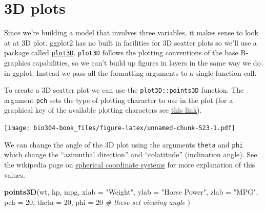 \documentclass[]{book}
\newenvironment{Shaded}{\begin{snugshade}}{\end{snugshade}}
\newcommand{\CommentTok}[1]{\textcolor[rgb]{0.56,0.35,0.01}{\textit{#1}}}
\newcommand{\DataTypeTok}[1]{\textcolor[rgb]{0.13,0.29,0.53}{#1}}
\newcommand{\DecValTok}[1]{\textcolor[rgb]{0.00,0.00,0.81}{#1}}
\newcommand{\KeywordTok}[1]{\textcolor[rgb]{0.13,0.29,0.53}{\textbf{#1}}}
\newcommand{\NormalTok}[1]{#1}
\newcommand{\OperatorTok}[1]{\textcolor[rgb]{0.81,0.36,0.00}{\textbf{#1}}}
\newcommand{\StringTok}[1]{\textcolor[rgb]{0.31,0.60,0.02}{#1}}
\theoremstyle{definition}
\theoremstyle{definition}
\theoremstyle{definition}
\theoremstyle{remark}
\begin{document}
\hypertarget{d-plots}{%
\section{3D plots}\label{d-plots}}

Since we're building a model that involves three variables, it makes
sense to look at at 3D plot. ggplot2 has no built in facilities for 3D
scatter plots so we'll use a package called
\href{http://www.rforscience.com/rpackages/visualisation/plot3d/}{\texttt{plot3D}}.
\texttt{plot3D} follows the plotting conventions of the base R-graphics
capabilities, so we can't build up figures in layers in the same way we
do in ggplot. Instead we pass all the formatting arguments to a single
function call.

To create a 3D scatter plot we can use the \texttt{plot3D::points3D}
function. The argument \texttt{pch} sets the type of plotting character
to use in the plot (for a graphical key of the available plotting
characters see
\href{https://www.statmethods.net/advgraphs/parameters.html}{this
link}).

\begin{Shaded}
\end{Shaded}

\texttt{[image: bio304-book\_files/figure-latex/unnamed-chunk-523-1.pdf]}

We can change the angle of the 3D plot using the arguments
\texttt{theta} and \texttt{phi} which change the ``azimuthal direction''
and ``colatitude'' (inclination angle). See the wikipedia page on
\href{https://en.wikipedia.org/wiki/Spherical_coordinate_system}{spherical
coordinate systems} for more explanation of this values.

\begin{Shaded}
\begin{Highlighting}[]
\KeywordTok{points3D}\NormalTok{(wt, hp, mpg,}
         \DataTypeTok{xlab =} \StringTok{"Weight"}\NormalTok{, }\DataTypeTok{ylab =} \StringTok{"Horse Power"}\NormalTok{, }\DataTypeTok{zlab =} \StringTok{"MPG"}\NormalTok{,}
         \DataTypeTok{pch =} \DecValTok{20}\NormalTok{,}
         \DataTypeTok{theta =} \DecValTok{20}\NormalTok{, }\DataTypeTok{phi =} \DecValTok{20}  \CommentTok{# these set viewing angle}
\NormalTok{)}
\end{Highlighting}
\end{Shaded}
\end{document}
